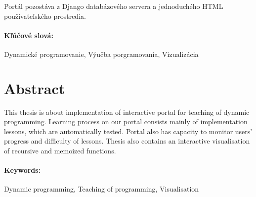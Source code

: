 \documentclass[12pt, oneside]{book}
\begin{document}
Portál pozostáva z Django databázového servera a jednoduchého HTML používateľského prostredia.

\paragraph*{Kľúčové slová:}Dynamické programovanie, Výučba porgramovania, Vizualizácia


\newpage
\section*{Abstract}
This thesis is about implementation of interactive portal for teaching
of dynamic programming. Learning process on our portal consists mainly of
implementation lessons, which are automatically tested. Portal also has capacity
to monitor users' progress and difficulty of lessons. Thesis also contains
an interactive visualisation of recursive and memoized functions.

\paragraph*{Keywords:} Dynamic programming, Teaching of programming, Visualisation


%
%



\newpage

\tableofcontents




\end{document}
